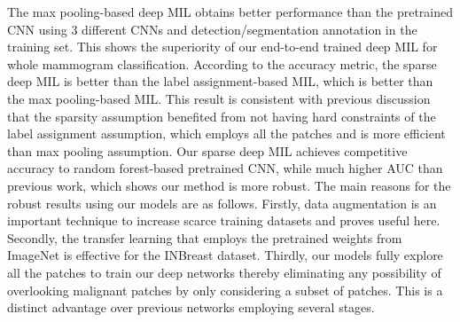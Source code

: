 \documentclass[runningheads,a4paper]{llncs}
\begin{document}
The max pooling-based deep MIL obtains better performance than the pretrained CNN using 3 different CNNs and detection/segmentation annotation in the training set. This shows the superiority of our end-to-end trained deep MIL for whole mammogram classification. According to the accuracy metric, the sparse deep MIL is better than the label assignment-based MIL, which is better than the max pooling-based MIL. This result is consistent with previous discussion that the sparsity assumption benefited from not having hard constraints of the label assignment assumption, which employs all the patches and is more efficient than max pooling assumption. Our sparse deep MIL achieves competitive accuracy to random forest-based pretrained CNN, while much higher AUC than previous work, which shows our method is more robust. The main reasons for the robust results using our models are as follows. Firstly, data augmentation is an important technique to increase scarce training datasets and proves useful here. Secondly, the transfer learning that employs the pretrained weights from ImageNet is effective for the INBreast dataset. Thirdly, our models fully explore all the patches to train our deep networks thereby eliminating any possibility of overlooking malignant patches by only considering a subset of patches. This is a distinct advantage over previous networks employing several stages.%
\end{document}
